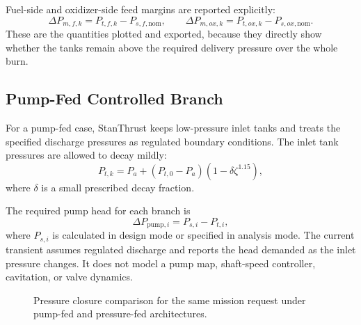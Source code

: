 \documentclass[11pt]{article}
\begin{document}
Fuel-side and oxidizer-side feed margins are reported explicitly:
\begin{equation}
\Delta P_{m,f,k}=P_{t,f,k}-P_{s,f,\text{nom}},
\qquad
\Delta P_{m,ox,k}=P_{t,ox,k}-P_{s,ox,\text{nom}}.
\label{eq:pressure-fed-margins}
\end{equation}
These are the quantities plotted and exported, because they directly show whether the tanks remain above the required delivery pressure over the whole burn.

\subsection{Pump-Fed Controlled Branch}
For a pump-fed case, StanThrust keeps low-pressure inlet tanks and treats the specified discharge pressures as regulated boundary conditions.
The inlet tank pressures are allowed to decay mildly:
\begin{equation}
P_{t,k}
=
P_a + (P_{t,0}-P_a)\left(1-\delta\zeta^{1.15}\right),
\label{eq:pump-inlet-decay}
\end{equation}
where $\delta$ is a small prescribed decay fraction.

The required pump head for each branch is
\begin{equation}
\Delta P_{\text{pump},i}
=P_{s,i}-P_{t,i},
\label{eq:pump-required-discharge}
\end{equation}
where $P_{s,i}$ is calculated in design mode or specified in analysis mode. The current transient assumes regulated discharge and reports the head demanded as the inlet pressure changes. It does not model a pump map, shaft-speed controller, cavitation, or valve dynamics.

\begin{figure}[H]
\centering
{}
\caption{Pressure closure comparison for the same mission request under pump-fed and pressure-fed architectures.}
\end{figure}
\end{document}
